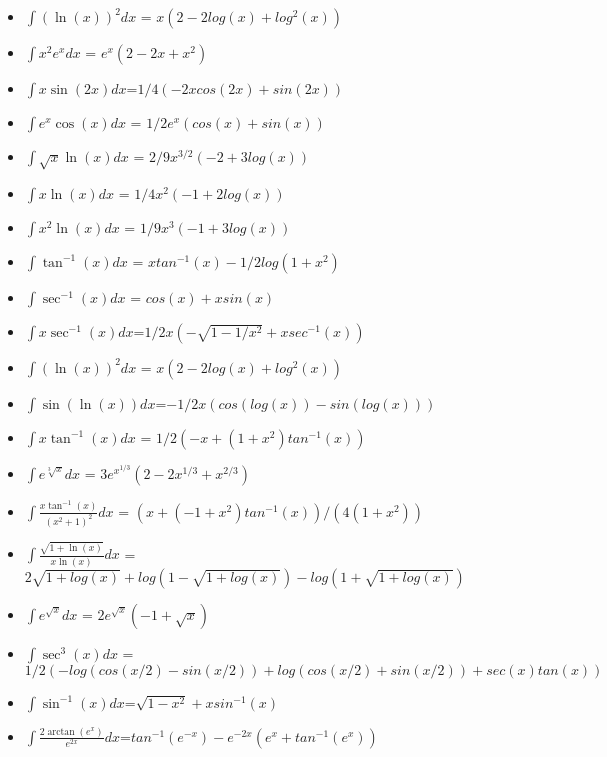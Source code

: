 \begin{itemize}
\tightlist
\item
  \(\displaystyle\int (\ln(x))^2 dx\) = \(x (2 - 2 log(x) + log^2(x))\)
\item
  \(\displaystyle\int x^2e^x dx\) = \(e^x (2 - 2 x + x^2)\)
\item
  \(\displaystyle\int x\sin(2x) dx\)=\(1/4 (-2 x cos(2 x) + sin(2 x))\)
\item
  \(\displaystyle\int e^x\cos(x) dx\) = \(1/2 e^x (cos(x) + sin(x))\)
\item
  \(\displaystyle\int \sqrt{x}\ln(x) dx\) =
  \(2/9 x^{3/2} (-2 + 3 log(x))\)
\item
  \(\displaystyle\int x\ln(x) dx\) = \(1/4 x^2 (-1 + 2 log(x))\)
\item
  \(\displaystyle\int x^2\ln(x) dx\) = \(1/9 x^3 (-1 + 3 log(x))\)
\item
  \(\displaystyle\int \tan^{-1}(x) dx\) =
  \(x tan^{-1}(x) - 1/2 log(1 + x^2)\)
\item
  \(\displaystyle\int \sec^{-1}(x) dx\) = \({cos(x) + x sin(x)}\)
\item
  \(\displaystyle\int x\sec^{-1}(x) dx\)=\(1/2 x (-\sqrt{1 - 1/x^2} + x sec^{-1}(x))\)
\item
  \(\displaystyle\int (\ln(x))^2 dx\) = \(x (2 - 2 log(x) + log^2(x))\)
\item
  \(\displaystyle\int \sin(\ln(x)) dx\)=\(-1/2 x (cos(log(x)) - sin(log(x)))\)
\item
  \(\displaystyle\int x\tan^{-1}(x) dx\) =
  \(1/2 (-x + (1 + x^2) tan^{-1}(x))\)
\item
  \(\displaystyle\int e^{\sqrt[3]{x}} dx\) =
  \(3e^{x^{1/3}} (2 - 2x^{1/3}+ x^{2/3})\)
\item
  \(\displaystyle\int \frac{x\tan^{-1}(x)}{(x^2+1)^2} dx\) =
  \((x + (-1 + x^2)tan^{-1}(x))/(4 (1 + x^2))\)
\item
  \(\displaystyle\int \frac{\sqrt{1+\ln(x)}}{x\ln(x)} dx\) =
  \(2\sqrt{1 + log(x)} + log(1 - \sqrt{1 + log(x)}) - log(1 + \sqrt{1 + log(x)})\)
\item
  \(\displaystyle\int e^{\sqrt{x}} dx\) =
  \(2e^\sqrt{x} (-1 + \sqrt{x})\)
\item
  \(\displaystyle\int \sec^3(x) dx\) =
  \(1/2 (-log(cos(x/2) - sin(x/2)) + log(cos(x/2) + sin(x/2)) + sec(x) tan(x))\)
\item
  \(\displaystyle\int \sin^{-1}(x) dx\)=\(\sqrt{1 - x^2} + x sin^{-1}(x)\)
\item
  \(\displaystyle\int \frac{2\arctan(e^x)}{e^{2x}}dx\)=\(tan^{-1}(e^{-x}) - e^{-2x}(e^x + tan^{-1}(e^x))\)
\end{itemize}

